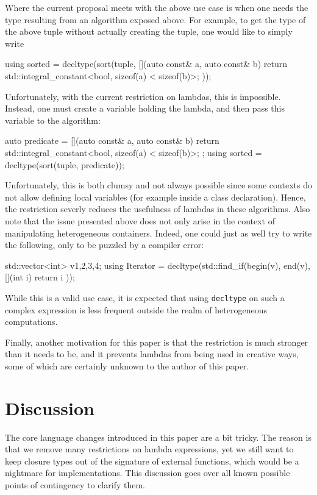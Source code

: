 \documentclass{wg21}
\newcommand{\cc}[1]{\texttt{#1}}
\begin{document}
Where the current proposal meets with the above use case is when one needs the type
resulting from an algorithm exposed above. For example, to get the type of the above
tuple without actually creating the tuple, one would like to simply write

\begin{cpp}
using sorted = decltype(sort(tuple, [](auto const& a, auto const& b) {
  return std::integral_constant<bool, sizeof(a) < sizeof(b)>{};
}));
\end{cpp}

Unfortunately, with the current restriction on lambdas, this is impossible.
Instead, one must create a variable holding the lambda, and then pass this
variable to the algorithm:

\begin{cpp}
auto predicate = [](auto const& a, auto const& b) {
  return std::integral_constant<bool, sizeof(a) < sizeof(b)>{};
};
using sorted = decltype(sort(tuple, predicate));
\end{cpp}

Unfortunately, this is both clumsy and not always possible since some contexts
do not allow defining local variables (for example inside a class declaration).
Hence, the restriction severly reduces the usefulness of lambdas in these algorithms.
Also note that the issue presented above does not only arise in the context of
manipulating heterogeneous containers. Indeed, one could just as well try to
write the following, only to be puzzled by a compiler error:

\begin{cpp}
std::vector<int> v{1,2,3,4};
using Iterator = decltype(std::find_if(begin(v), end(v), [](int i) {
  return i %
}));
\end{cpp}

While this is a valid use case, it is expected that using \cc{decltype} on
such a complex expression is less frequent outside the realm of heterogeneous
computations.

Finally, another motivation for this paper is that the restriction is much stronger
than it needs to be, and it prevents lambdas from being used in creative ways,
some of which are certainly unknown to the author of this paper.


\section{Discussion}
The core language changes introduced in this paper are a bit tricky. The reason
is that we remove many restrictions on lambda expressions, yet we still want to
keep closure types out of the signature of external functions, which would be
a nightmare for implementations. This discussion goes over all known possible
points of contingency to clarify them.
\end{document}
